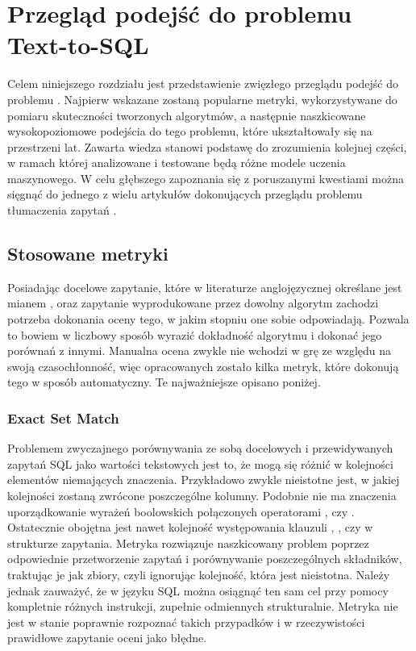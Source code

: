 \chapter{Przegląd podejść do problemu Text-to-SQL}
Celem niniejszego rozdziału jest przedstawienie zwięzłego przeglądu podejść do problemu . Najpierw wskazane zostaną popularne metryki, wykorzystywane do pomiaru skuteczności tworzonych algorytmów, a następnie naszkicowane wysokopoziomowe podejścia do tego problemu, które ukształtowały się na przestrzeni lat. Zawarta wiedza stanowi podstawę do zrozumienia kolejnej części, w ramach której analizowane i testowane będą różne modele uczenia maszynowego. W celu głębszego zapoznania się z poruszanymi kwestiami można sięgnąć do jednego z wielu artykułów dokonujących przeglądu problemu tłumaczenia zapytań .

\section{Stosowane metryki}
\label{section:metrics}
Posiadając docelowe zapytanie, które w literaturze anglojęzycznej określane jest mianem , oraz zapytanie wyprodukowane przez dowolny algorytm zachodzi potrzeba dokonania oceny tego, w jakim stopniu one sobie odpowiadają. Pozwala to bowiem w liczbowy sposób wyrazić dokładność algorytmu i dokonać jego porównań z innymi. Manualna ocena zwykle nie wchodzi w grę ze względu na swoją czasochłonność, więc opracowanych zostało kilka metryk, które dokonują tego w sposób automatyczny. Te najważniejsze opisano poniżej.

\subsection{Exact Set Match}
Problemem zwyczajnego porównywania ze sobą docelowych i przewidywanych zapytań SQL jako wartości tekstowych jest to, że mogą się różnić w kolejności elementów niemających znaczenia. Przykładowo zwykle nieistotne jest, w jakiej kolejności zostaną zwrócone poszczególne kolumny. Podobnie nie ma znaczenia uporządkowanie wyrażeń boolowskich połączonych operatorami , czy . Ostatecznie obojętna jest nawet kolejność występowania klauzuli , , czy  w strukturze zapytania. Metryka  rozwiązuje naszkicowany problem poprzez odpowiednie przetworzenie zapytań i porównywanie poszczególnych składników, traktując je jak zbiory, czyli ignorując kolejność, która jest nieistotna. Należy jednak zauważyć, że w języku SQL można osiągnąć ten sam cel przy pomocy kompletnie różnych instrukcji, zupełnie odmiennych strukturalnie. Metryka  nie jest w stanie poprawnie rozpoznać takich przypadków i w rzeczywistości prawidłowe zapytanie oceni jako błędne.


